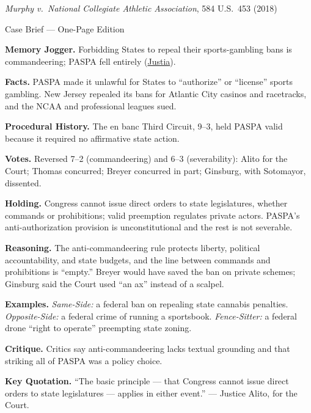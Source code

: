 \documentclass[12pt]{article}
\begin{document}
\begin{center}
{\Large \textit{Murphy v.\ National Collegiate Athletic Association}, 584 U.S.\ 453 (2018)\par}
\vspace{0.3em}
{\normalsize Case Brief --- One-Page Edition\par}
\end{center}

\textbf{Memory Jogger.} Forbidding States to repeal their sports-gambling bans is commandeering; PASPA fell entirely (\href{https://supreme.justia.com/cases/federal/us/584/16-476/}{Justia}).

\textbf{Facts.} PASPA made it unlawful for States to ``authorize'' or ``license'' sports gambling. New Jersey repealed its bans for Atlantic City casinos and racetracks, and the NCAA and professional leagues sued.

\textbf{Procedural History.} The en banc Third Circuit, 9--3, held PASPA valid because it required no affirmative state action.

\textbf{Votes.} Reversed 7--2 (commandeering) and 6--3 (severability): Alito for the Court; Thomas concurred; Breyer concurred in part; Ginsburg, with Sotomayor, dissented.

\textbf{Holding.} Congress cannot issue direct orders to state legislatures, whether commands or prohibitions; valid preemption regulates private actors. PASPA's anti-authorization provision is unconstitutional and the rest is not severable.

\textbf{Reasoning.} The anti-commandeering rule protects liberty, political accountability, and state budgets, and the line between commands and prohibitions is ``empty.'' Breyer would have saved the ban on private schemes; Ginsburg said the Court used ``an ax'' instead of a scalpel.

\textbf{Examples.} \emph{Same-Side:} a federal ban on repealing state cannabis penalties. \emph{Opposite-Side:} a federal crime of running a sportsbook. \emph{Fence-Sitter:} a federal drone ``right to operate'' preempting state zoning.

\textbf{Critique.} Critics say anti-commandeering lacks textual grounding and that striking all of PASPA was a policy choice.

\textbf{Key Quotation.} ``The basic principle --- that Congress cannot issue direct orders to state legislatures --- applies in either event.'' --- Justice Alito, for the Court.
\end{document}
